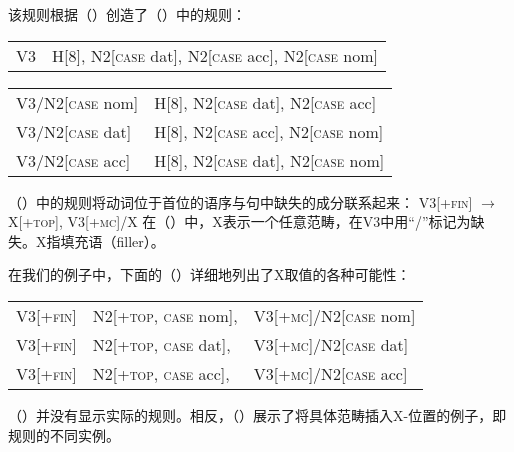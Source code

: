 \noindent
该规则根据（）创造了（）中的规则：
\ea
\begin{tabular}[t]{@{}l@{~$\to$~}l@{}}
V3  & H[8], N2[\textsc{case} dat], N2[\textsc{case} acc], N2[\textsc{case} nom] 
\end{tabular}
\z
\ea
\begin{tabular}[t]{@{}l@{~$\to$~}l@{}}
V3/N2[\textsc{case} nom] &  H[8], N2[\textsc{case} dat], N2[\textsc{case} acc]\\
V3/N2[\textsc{case} dat] &  H[8], N2[\textsc{case} acc], N2[\textsc{case} nom]\\
V3/N2[\textsc{case} acc] &  H[8], N2[\textsc{case} dat], N2[\textsc{case} nom]\\
\end{tabular}
\z

\noindent
（）中的规则将动词位于首位的语序与句中缺失的成分联系起来：
\ea
\label{gpsg-vs-regel}
V3[+\textsc{fin}] $\to$ X[+\textsc{top}], V3[+\textsc{mc}]/X
\z
在（）中，X表示一个任意范畴，在V3中用“/”标记为缺失。X指填充语（filler）。

在我们的例子中，下面的（）详细地列出了X取值的各种可能性：
\ea
\begin{tabular}[t]{@{}l@{~$\to$~}l@{~}l@{}}
V3[+\textsc{fin}] & N2[+\textsc{top}, \textsc{case} nom], & V3[+\textsc{mc}]/N2[\textsc{case} nom]\\
V3[+\textsc{fin}] & N2[+\textsc{top}, \textsc{case} dat], & V3[+\textsc{mc}]/N2[\textsc{case} dat]\\
V3[+\textsc{fin}] & N2[+\textsc{top}, \textsc{case} acc], & V3[+\textsc{mc}]/N2[\textsc{case} acc]\\
\end{tabular}
\z
（）并没有显示实际的规则。相反，（）展示了将具体范畴插入X-位置的例子，即规则的不同实例。

